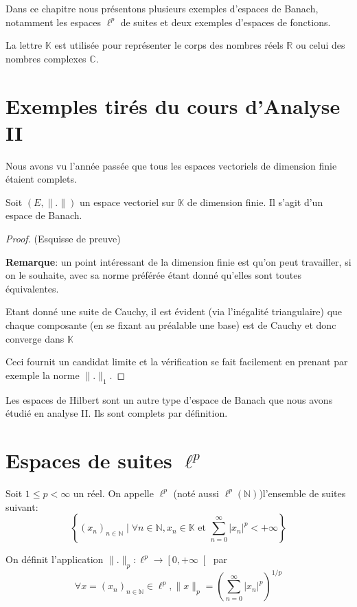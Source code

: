 Dans ce chapitre nous présentons plusieurs exemples d'espaces de Banach,
notamment les espaces $\ell^p$ de suites et deux exemples d'espaces de fonctions.

La lettre $\mathbb{K}$ est utilisée pour représenter le
corps des nombres réels $\mathbb{R}$ ou celui des nombres
complexes $\mathbb{C}$.
\section{Exemples tirés du cours d'Analyse II}

Nous avons vu l'année passée que tous les espaces vectoriels
de dimension finie étaient complets.
\begin{prop}
  Soit $(E, \|.\|)$ un espace vectoriel sur $\mathbb{K}$
  de dimension finie. Il s'agit d'un espace de Banach.
\end{prop}
\begin{proof}(Esquisse de preuve)

  \textbf{Remarque}: un point intéressant de la dimension finie est qu'on
  peut travailler, si on le souhaite, avec sa norme
  préférée étant donné qu'elles sont toutes équivalentes.

  Etant donné une suite de Cauchy, il est évident (via l'inégalité
  triangulaire) que chaque composante (en se fixant au préalable
  une base) est de Cauchy et donc converge dans $\mathbb{K}$

  Ceci fournit un candidat limite et la vérification se fait
  facilement en prenant par exemple la norme $\|.\|_1$.
\end{proof}

Les espaces de Hilbert sont un autre type d'espace de Banach
que nous avons étudié en analyse II. Ils sont complets par
définition.

\section{Espaces de suites $\ell^p$}
\begin{df}
  Soit $1\leq p<\infty$ un réel. On appelle $\ell^p$ (noté aussi
  $\ell^p(\mathbb{N})$)l'ensemble  de suites suivant:
  \begin{equation*}
    \left\{(x_n)_{n\in\mathbb{N}}\mid
       \forall  n\in\mathbb{N}, x_n\in\mathbb{K} \mbox{ et }
      \sum_{n=0}^\infty|x_n|^p<+\infty\right\}
  \end{equation*}

  On définit l'application $\|.\|_p:\ell^p\to\left[0, +\infty\right[$
  par
  $$ \forall  x=(x_n)_{n\in\mathbb{N}}\in \ell^p, \|x\|_p=
  \left(\sum_{n=0}^\infty|x_n|^p\right)^{1/p}$$
\end{df}

